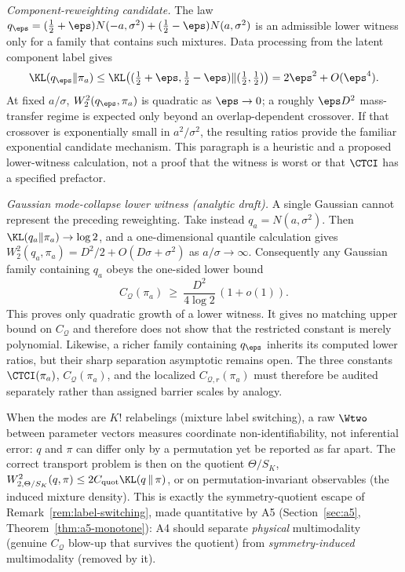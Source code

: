 \documentclass[../../main.tex]{subfiles}
\begin{document}
\emph{Component-reweighting candidate.} The law
$q_\eps=(\tfrac12+\eps)N(-a,\sigma^2)+(\tfrac12-\eps)N(a,\sigma^2)$ is an admissible lower witness
only for a family that contains such mixtures. Data processing from the latent component label
gives
\[
 \KL(q_\eps\|\pi_a)\le
 \KL\big((\tfrac12+\eps,\tfrac12-\eps)\|(\tfrac12,\tfrac12)\big)
 =2\eps^2+O(\eps^4).
\]
At fixed $a/\sigma$, $W_2^2(q_\eps,\pi_a)$ is quadratic as $\eps\to0$; a roughly
$\eps D^2$ mass-transfer regime is expected only beyond an overlap-dependent crossover. If that
crossover is exponentially small in $a^2/\sigma^2$, the resulting ratios provide the familiar
exponential candidate mechanism. This paragraph is a heuristic and a proposed lower-witness
calculation, not a proof that the witness is worst or that $\CTCI$ has a specified prefactor.

\emph{Gaussian mode-collapse lower witness (analytic draft).} A single Gaussian cannot represent the preceding
reweighting. Take instead $q_a=N(a,\sigma^2)$. Then
$\KL(q_a\|\pi_a)\to\log2$, and a one-dimensional quantile calculation gives
$W_2^2(q_a,\pi_a)=D^2/2+O(D\sigma+\sigma^2)$ as $a/\sigma\to\infty$. Consequently any Gaussian
family containing $q_a$ obeys the one-sided lower bound
\begin{equation}\label{eq:a4-modecollapse}
  C_{\mathcal Q}(\pi_a)\ \ge\ \frac{D^2}{4\log2}\,(1+o(1)).
\end{equation}
This proves only quadratic growth of a lower witness. It gives no matching upper bound on
$C_{\mathcal Q}$ and therefore does not show that the restricted constant is merely polynomial.
Likewise, a richer family containing $q_\eps$ inherits its computed lower ratios, but their sharp
separation asymptotic remains open. The three constants $\CTCI(\pi_a)$,
$C_{\mathcal Q}(\pi_a)$, and the localized $C_{\mathcal Q,r}(\pi_a)$ must therefore be audited
separately rather than assigned barrier scales by analogy.

\begin{remark}
\label{rem:a4-quotient}
When the modes are $K!$ relabelings (mixture label switching), a raw $\Wtwo$ between parameter
vectors measures coordinate non-identifiability, not inferential error: $q$ and $\pi$ can differ
only by a permutation yet be reported as far apart. The correct transport problem is then on the
quotient $\Theta/S_K$, $W_{2,\Theta/S_K}^2(q,\pi)\le2C_{\mathrm{quot}}\KL(q\,\|\,\pi)$, or on
permutation-invariant observables (the induced mixture density). This is exactly the
symmetry-quotient escape of Remark~\ref{rem:label-switching}, made quantitative by A5
(Section~\ref{sec:a5}, Theorem~\ref{thm:a5-monotone}): A4 should separate \emph{physical}
multimodality (genuine $C_{\mathcal Q}$ blow-up that survives the quotient) from
\emph{symmetry-induced} multimodality (removed by it).
\end{remark}
\end{document}
